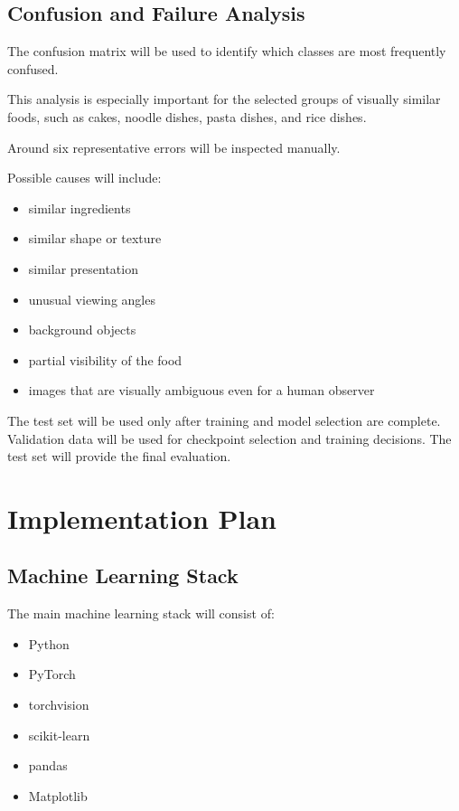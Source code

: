 \documentclass[11pt,a4paper]{article}
\begin{document}
\subsection{Confusion and Failure Analysis}

The confusion matrix will be used to identify which classes are most frequently
confused.

This analysis is especially important for the selected groups of visually similar
foods, such as cakes, noodle dishes, pasta dishes, and rice dishes.

Around six representative errors will be inspected manually.

Possible causes will include:

\begin{itemize}
    \item similar ingredients
    \item similar shape or texture
    \item similar presentation
    \item unusual viewing angles
    \item background objects
    \item partial visibility of the food
    \item images that are visually ambiguous even for a human observer
\end{itemize}

The test set will be used only after training and model selection are complete.
Validation data will be used for checkpoint selection and training decisions.
The test set will provide the final evaluation.


\section{Implementation Plan}

\subsection{Machine Learning Stack}

The main machine learning stack will consist of:

\begin{itemize}
    \item Python
    \item PyTorch
    \item torchvision
    \item scikit-learn
    \item pandas
    \item Matplotlib
\end{itemize}
\end{document}

